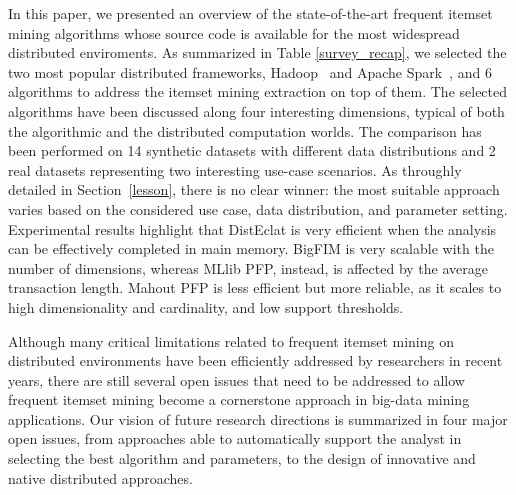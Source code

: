 
In this paper, we presented an overview of the state-of-the-art frequent
itemset mining algorithms
whose source code is available for the most widespread distributed enviroments.
As summarized in Table \ref{survey_recap}, we selected the two
most popular distributed frameworks,
Hadoop~\cite{HDFS} and Apache Spark~\cite{Zaharia_spark}, and 6 algorithms to
address the itemset mining extraction on top of them.
The selected algorithms have been discussed along four interesting dimensions,
typical of both the algorithmic and the distributed computation worlds.
The comparison has been performed on 14 synthetic datasets with
different data distributions and 2 real datasets representing two interesting
use-case scenarios.
As throughly detailed in Section~\ref{lesson}, there is no clear winner:
the most suitable approach varies based on the considered use case, data distribution, and parameter setting.
Experimental results highlight that DistEclat
is very efficient when the analysis can be effectively
completed in main memory.
BigFIM is very scalable with the number of dimensions,
whereas MLlib PFP, instead, is affected by the average transaction length.
Mahout PFP is less efficient but more reliable,
as it scales to high dimensionality and cardinality,
and low support thresholds.

Although many critical limitations related
to frequent itemset mining on distributed environments have been efficiently
addressed by researchers in recent years, there are still several
open issues that need to be addressed
to allow frequent itemset mining become a cornerstone approach
in big-data mining applications.
Our vision of future research directions is
summarized in four major open issues,
from approaches able to automatically support the analyst
in selecting the best algorithm and parameters,
to the design of innovative and native distributed approaches.



